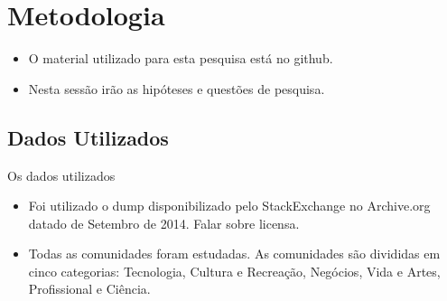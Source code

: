 \chapter{Metodologia}

\begin{itemize}
	\item O material utilizado para esta pesquisa está no github.
	\item Nesta sessão irão as hipóteses e questões de pesquisa.
\end{itemize}

\section{Dados Utilizados} %
\label{sub:dados_utilizados}
Os dados utilizados 
\begin{itemize}
	\item Foi utilizado o dump disponibilizado pelo StackExchange no Archive.org datado de Setembro de 2014. Falar sobre licensa.
	\item Todas as comunidades foram estudadas. As comunidades são divididas em cinco categorias: Tecnologia, Cultura e Recreação, Negócios, Vida e Artes, Profissional e Ciência.

\end{itemize}


